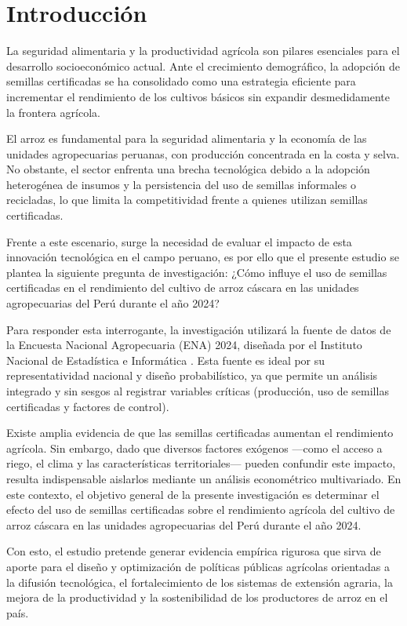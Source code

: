 \documentclass[11pt,a4paper,twocolumn]{article}
\begin{document}
\thispagestyle{empty} 
\clearpage 

\section{Introducción}
La seguridad alimentaria y la productividad agrícola son pilares esenciales para el desarrollo socioeconómico actual. Ante el crecimiento demográfico, la adopción de semillas certificadas se ha consolidado como una estrategia eficiente para incrementar el rendimiento de los cultivos básicos sin expandir desmedidamente la frontera agrícola.

El arroz es fundamental para la seguridad alimentaria y la economía de las unidades agropecuarias peruanas, con producción concentrada en la costa y selva. No obstante, el sector enfrenta una brecha tecnológica debido a la adopción heterogénea de insumos y la persistencia del uso de semillas informales o recicladas, lo que limita la competitividad frente a quienes utilizan semillas certificadas.

Frente a este escenario, surge la necesidad de evaluar el impacto de esta innovación tecnológica en el campo peruano, es por ello que el presente estudio se plantea la siguiente pregunta de investigación: ¿Cómo influye el uso de semillas certificadas en el rendimiento del cultivo de arroz cáscara en las unidades agropecuarias del Perú durante el año 2024?

Para responder esta interrogante, la investigación utilizará la fuente de datos de la Encuesta Nacional Agropecuaria (ENA) 2024, diseñada por el Instituto Nacional de Estadística e Informática \citep{inei2024a}. Esta fuente es ideal por su representatividad nacional y diseño probabilístico, ya que permite un análisis integrado y sin sesgos al registrar variables críticas (producción, uso de semillas certificadas y factores de control).

Existe amplia evidencia de que las semillas certificadas aumentan el rendimiento agrícola. Sin embargo, dado que diversos factores exógenos —como el acceso a riego, el clima y las características territoriales— pueden confundir este impacto, resulta indispensable aislarlos mediante un análisis econométrico multivariado. En este contexto, el objetivo general de la presente investigación es determinar el efecto del uso de semillas certificadas sobre el rendimiento agrícola del cultivo de arroz cáscara en las unidades agropecuarias del Perú durante el año 2024.

Con esto, el estudio pretende generar evidencia empírica rigurosa que sirva de aporte para el diseño y optimización de políticas públicas agrícolas orientadas a la difusión tecnológica, el fortalecimiento de los sistemas de extensión agraria, la mejora de la productividad y la sostenibilidad de los productores de arroz en el país.
\end{document}
